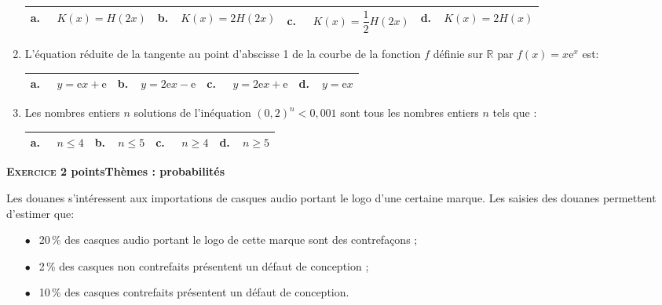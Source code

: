 \documentclass[10pt,a4paper]{article}
\newcommand{\R}{\mathbb{R}}
\begin{document}
\begin{enumerate}
\begin{center}
\begin{tabularx}{\linewidth}{|*{4}{X|}}\hline
\textbf{a.~~} $K(x) =H(2x)$&\textbf{b.~~}$K(x) =2H(2x)$&\textbf{c.~~} $ K(x) =\dfrac{1}{2}H(2x)$&\textbf{d.~~}$K(x) =2H(x)$\rule[-3mm]{0mm}{9mm}\\ \hline
\end{tabularx}
\end{center}

\item L'équation réduite de la tangente au point d'abscisse 1 de la courbe de la fonction $f$ définie sur $\R$ par $f(x) = x\text{e}^x$ est:

\begin{center}
\begin{tabularx}{\linewidth}{|*{4}{X|}}\hline
\textbf{a.~~} $y = \text{e}x + \text{e}$&\textbf{b.~~}$y =2\text{e}x - \text{e}$&\textbf{c.~~} $y = 2\text{e}x +  \text{e}$&\textbf{d.~~}$y = \text{e}x$\\ \hline
\end{tabularx}
\end{center}

\item Les nombres entiers $n$ solutions de l'inéquation $(0,2)^n < 0,001$ sont tous les
nombres entiers $n$ tels que :

\begin{center}
\begin{tabularx}{\linewidth}{|*{4}{X|}}\hline
\textbf{a.~~} $n \leqslant 4$&\textbf{b.~~}$n\leqslant 5$&\textbf{c.~~} $n \geqslant 4$ &\textbf{d.~~}$n \geqslant 5$\\ \hline
\end{tabularx}
\end{center}

\end{enumerate}

\bigskip

\textbf{\textsc{Exercice 2}  points\hfill Thèmes : probabilités}

\medskip

Les douanes s'intéressent aux importations de casques audio portant le logo d'une certaine marque. Les saisies des douanes permettent d'estimer que:

\setlength\parindent{10mm}
\begin{itemize}
\item[$\bullet~~$] 20\,\% des casques audio portant le logo de cette marque sont des contrefaçons ;
\item[$\bullet~~$] 2\,\% des casques non contrefaits présentent un défaut de conception ;\item[$\bullet~~$] 10\,\% des casques contrefaits présentent un défaut de conception.
\end{itemize}
\setlength\parindent{0mm}
\end{document}
